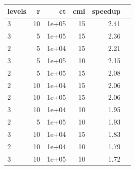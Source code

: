 \begin{tabular}{l|rrrrr}
\hline
levels & r & ct & cmi & speedup \\
\hline
3 & 10 & 1e+05 & 15 & 2.41 \\
3 & 5 & 1e+05 & 15 & 2.36 \\
2 & 5 & 1e+04 & 15 & 2.21 \\
3 & 5 & 1e+05 & 10 & 2.15 \\
2 & 5 & 1e+05 & 15 & 2.08 \\
2 & 10 & 1e+04 & 15 & 2.06 \\
2 & 10 & 1e+05 & 15 & 2.06 \\
3 & 10 & 1e+04 & 10 & 1.95 \\
2 & 5 & 1e+05 & 10 & 1.93 \\
3 & 10 & 1e+04 & 15 & 1.83 \\
2 & 10 & 1e+04 & 10 & 1.79 \\
3 & 10 & 1e+05 & 10 & 1.72 \\
\hline
\end{tabular}
